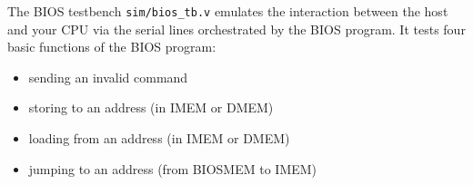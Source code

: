 The BIOS testbench \verb|sim/bios_tb.v| emulates the interaction between
the host and your CPU via the serial lines orchestrated by the BIOS program.
It tests four basic functions of the BIOS program:
\begin{itemize}
\item sending an invalid command
\item storing to an address (in IMEM or DMEM)
\item loading from an address (in IMEM or DMEM)
\item jumping to an address (from BIOSMEM to IMEM)
\end{itemize}


\newpage
